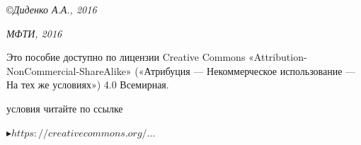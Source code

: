 \medskip

\copyright \textsl{Диденко А.А., 2016}

\medspace

\textsl{МФТИ, 2016}

\vspace*{\fill}


\noindent
\begin{minipage}[t]{0.61\textwidth}
\quad\small Это пособие доступно по лицензии Creative Commons «Attribution-NonCommercial-ShareAlike» («Атрибуция — Некоммерческое использование — На тех же условиях») 4.0 Всемирная.

 условия читайте по ссылке

\qquad\href{https://creativecommons.org/licenses/by-nc-sa/4.0/deed.ru}{\textcolor{Purplemountainmajesty}{$\blacktriangleright https://creativecommons.org/...$}}
\end{minipage}%
\hfill%
\begin{minipage}[t]{\dimexpr(0.39\textwidth-2mm)}
\end{minipage}
